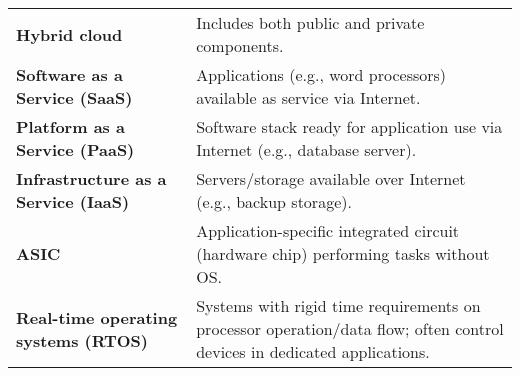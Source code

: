 \documentclass{article}
\begin{document}
\begin{tabular}{>{\raggedright}p{} >{\raggedright\arraybackslash}p{}}
\textbf{Hybrid cloud} & Includes both public and private components. \\
\textbf{Software as a Service (SaaS)} & Applications (e.g., word processors) available as service via Internet. \\
\textbf{Platform as a Service (PaaS)} & Software stack ready for application use via Internet (e.g., database server). \\
\textbf{Infrastructure as a Service (IaaS)} & Servers/storage available over Internet (e.g., backup storage). \\
\textbf{ASIC} & Application-specific integrated circuit (hardware chip) performing tasks without OS. \\
\textbf{Real-time operating systems (RTOS)} & Systems with rigid time requirements on processor operation/data flow; often control devices in dedicated applications. \\
\bottomrule
\end{tabular}
\vspace{\baselineskip}
\newpage
\end{document}
